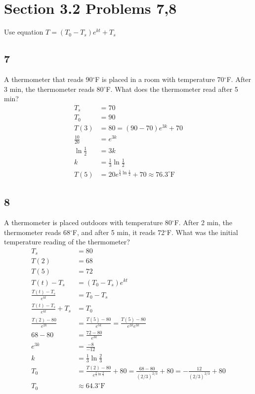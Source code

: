 \documentclass{article}
\begin{document}
\section*{Section 3.2 Problems 7,8}
Use equation $T=(T_0-T_s)e^{kt}+T_s$
\subsection*{7}
A thermometer that reads 90$^\circ$F is placed in a room with temperature 70$^\circ$F. After 3 min, the thermometer reads 80$^\circ$F. What does the thermometer read after 5 min?
\begin{align*}
	T_s&=70\\
	T_0&=90\\
	T(3)&=80=(90-70)e^{3k}+70\\
	\frac{10}{20}&=e^{3k}\\
	\ln\frac{1}{2}&=3k\\
	k&=\frac{1}{3}\ln\frac{1}{2}\\
	T(5)&=20e^{\frac{5}{3}\ln\frac{1}{2}}+70\approx76.3^\circ\mathrm{F}
\end{align*}
\subsection*{8}
A thermometer is placed outdoors with temperature 80$^\circ$F. After 2 min, the thermometer reads 68$^\circ$F, and after 5 min, it reads 72$^\circ$F. What was the initial temperature reading of the thermometer?
\begin{align*}
	T_s&=80\\
	T(2)&=68\\
	T(5)&=72\\
	T(t)-T_s&=(T_0-T_s)e^{kt}\\
	\frac{T(t)-T_s}{e^{kt}}&=T_0-T_s\\
	\frac{T(t)-T_s}{e^{kt}}+T_s&=T_0\\
	\frac{T(2)-80}{e^{2k}}&=\frac{T(5)-80}{e^{5k}}=\frac{T(5)-80}{e^{2k}e^{3k}}\\
	68-80&=\frac{72-80}{e^{3k}}\\
	e^{3k}&=\frac{-8}{-12}\\
	k&=\frac{1}{3}\ln\frac{2}{3}\\
	T_0&=\frac{T(2)-80}{e^{\frac{2}{3}\ln\frac{2}{3}}}+80=\frac{68-80}{(2/3)^{2/3}}+80=-\frac{12}{(2/3)^{2/3}}+80\\
	T_0&\approx64.3^\circ\mathrm{F}
\end{align*}
\end{document}
